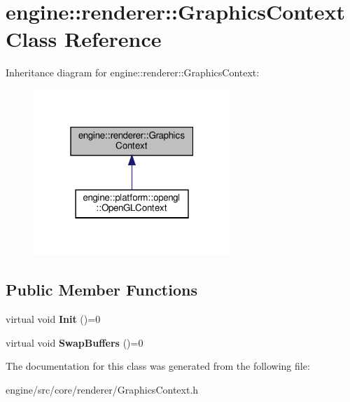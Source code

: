 \hypertarget{classengine_1_1renderer_1_1GraphicsContext}{}\section{engine\+:\+:renderer\+:\+:Graphics\+Context Class Reference}
\label{classengine_1_1renderer_1_1GraphicsContext}


Inheritance diagram for engine\+:\+:renderer\+:\+:Graphics\+Context\+:\nopagebreak
\begin{figure}[H]
\begin{center}
\leavevmode
\includegraphics[width=211pt]{classengine_1_1renderer_1_1GraphicsContext__inherit__graph}
\end{center}
\end{figure}
\subsection*{Public Member Functions}
\begin{DoxyCompactItemize}
\item 
\mbox{\label{classengine_1_1renderer_1_1GraphicsContext_ac7b94c5769b9464cdc2b71366fb0984b}} 
virtual void {\bfseries Init} ()=0
\item 
\mbox{\label{classengine_1_1renderer_1_1GraphicsContext_af4e7d29edd7912d32a07e139aef7a2f9}} 
virtual void {\bfseries Swap\+Buffers} ()=0
\end{DoxyCompactItemize}


The documentation for this class was generated from the following file\+:\begin{DoxyCompactItemize}
\item 
engine/src/core/renderer/Graphics\+Context.\+h\end{DoxyCompactItemize}
